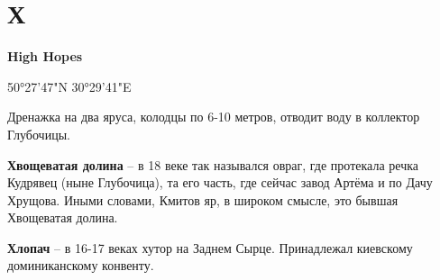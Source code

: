 \chapter*{Х}

\textbf{High Hopes} 

50°27'47"N 30°29'41"E

Дренажка на два яруса, колодцы по 6-10 метров, отводит воду в коллектор Глубочицы.\\

\medskip


\textbf{Хвощеватая долина} – в 18 веке так назывался овраг, где протекала речка Кудрявец (ныне Глубочица), та его часть, где сейчас завод Артёма и по Дачу Хрущова. Иными словами, Кмитов яр, в широком смысле, это бывшая Хвощеватая долина.\\

\medskip

\textbf{Хлопач} – в 16-17 веках хутор на Заднем Сырце. Принадлежал киевскому доминиканскому конвенту.